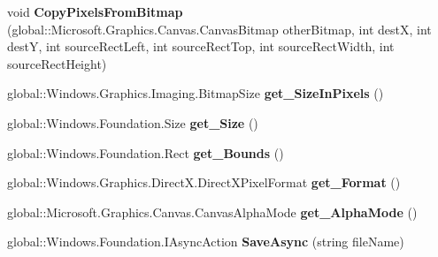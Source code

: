 \begin{DoxyCompactItemize}
\item 
\mbox{\label{interface_microsoft_1_1_graphics_1_1_canvas_1_1_i_canvas_bitmap_a6300f60ab1f71c5032c2680ae66ec957}} 
void {\bfseries Copy\+Pixels\+From\+Bitmap} (global\+::\+Microsoft.\+Graphics.\+Canvas.\+Canvas\+Bitmap other\+Bitmap, int destX, int destY, int source\+Rect\+Left, int source\+Rect\+Top, int source\+Rect\+Width, int source\+Rect\+Height)
\item 
\mbox{\label{interface_microsoft_1_1_graphics_1_1_canvas_1_1_i_canvas_bitmap_af2b4e8d31f7d4a3d849dc0f156a59a7e}} 
global\+::\+Windows.\+Graphics.\+Imaging.\+Bitmap\+Size {\bfseries get\+\_\+\+Size\+In\+Pixels} ()
\item 
\mbox{\label{interface_microsoft_1_1_graphics_1_1_canvas_1_1_i_canvas_bitmap_a0402608b6a37f8002b6fcc5ef95b8003}} 
global\+::\+Windows.\+Foundation.\+Size {\bfseries get\+\_\+\+Size} ()
\item 
\mbox{\label{interface_microsoft_1_1_graphics_1_1_canvas_1_1_i_canvas_bitmap_a9525b7941b7474c214ceda939e8a1f59}} 
global\+::\+Windows.\+Foundation.\+Rect {\bfseries get\+\_\+\+Bounds} ()
\item 
\mbox{\label{interface_microsoft_1_1_graphics_1_1_canvas_1_1_i_canvas_bitmap_a22ceb272a871aee9ccb6f36129c8cb25}} 
global\+::\+Windows.\+Graphics.\+Direct\+X.\+Direct\+X\+Pixel\+Format {\bfseries get\+\_\+\+Format} ()
\item 
\mbox{\label{interface_microsoft_1_1_graphics_1_1_canvas_1_1_i_canvas_bitmap_ab31c90d55255a3b262b19e7af008fb29}} 
global\+::\+Microsoft.\+Graphics.\+Canvas.\+Canvas\+Alpha\+Mode {\bfseries get\+\_\+\+Alpha\+Mode} ()
\item 
\mbox{\label{interface_microsoft_1_1_graphics_1_1_canvas_1_1_i_canvas_bitmap_ac4992fe87b3aa1e80423da03fcea6acf}} 
global\+::\+Windows.\+Foundation.\+I\+Async\+Action {\bfseries Save\+Async} (string file\+Name)

\end{DoxyCompactItemize}
